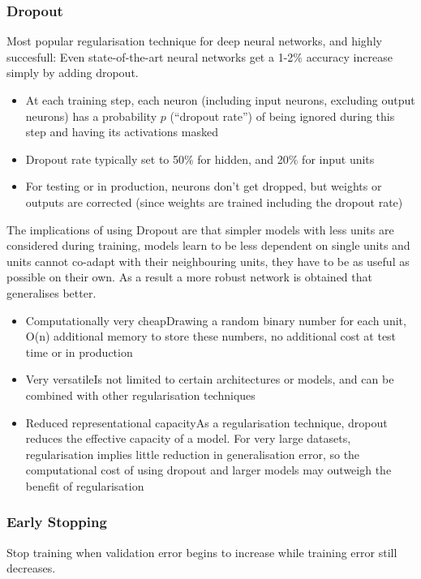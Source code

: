 \documentclass[11pt]{article}
\begin{document}
\subsubsection{Dropout}
Most popular regularisation technique for deep neural networks, and highly succesfull: Even state-of-the-art neural networks get a 1-2\% accuracy increase simply by adding dropout.
\begin{itemize}
	\item At each training step, each neuron (including input neurons, excluding output neurons) has a probability $p$ (“dropout rate”) of being ignored during this step and having its activations masked
	\item Dropout rate typically set to 50\% for hidden, and 20\% for input units
	\item For testing or in production, neurons don’t get dropped, but weights or outputs are corrected (since weights are trained including the dropout rate)
\end{itemize}

The implications of using Dropout are that simpler models with less units are considered during training, models learn to be less dependent on single units and units cannot co-adapt with their neighbouring units, they have to be as useful as possible on their own. As a result a more robust network is obtained that generalises better.

\begin{itemize}
	\item Computationally very cheap\quad Drawing a random binary number for each unit, O(n) additional memory to store these numbers, no additional cost at test time or in production
	\item Very versatile\quad Is not limited to certain architectures or models, and can be combined with other regularisation techniques
	\item Reduced representational capacity\quad As a regularisation technique, dropout reduces the effective capacity of a model. For very large datasets, regularisation implies little reduction in generalisation error, so the computational cost of using dropout and larger models may outweigh the benefit of regularisation
\end{itemize}

\subsubsection{Early Stopping}
Stop training when validation error begins to increase while training error still decreases.
\end{document}
